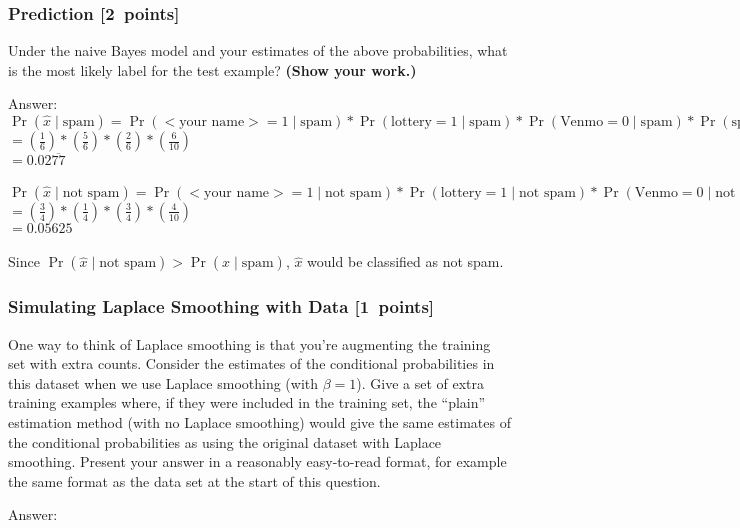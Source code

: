 \documentclass{article}
\newcommand{\blu}[1]{{\textcolor{blu}{#1}}}
\newenvironment{answer}{\par\begingroup\color{gre}Answer: }{\endgroup}
\let\ask\blu
\newcommand\pts[1]{\textcolor{pointscolour}{[#1~points]}}
\begin{document}
    \subsubsection{Prediction \pts{2}}

    \ask{Under the naive Bayes model and your estimates of the above probabilities, what is the most likely label for the test example? \textbf{(Show your work.)}}
    \begin{answer}\\
    $\Pr(\hat{x} \mid \text{spam}) = \Pr(\text{$<$your name$>$} = 1 \mid \text{spam}) * \Pr(\text{lottery} = 1 \mid \text{spam}) * \Pr(\text{Venmo} = 0 \mid \text{spam}) * \Pr(\text{spam})$ \\
    $= (\frac{1}{6}) * (\frac{5}{6}) * (\frac{2}{6}) * (\frac{6}{10})$ \\
    $= 0.02\overline{77}$ \\ \\
    $\Pr(\hat{x} \mid \text{not spam}) = \Pr(\text{$<$your name$>$} = 1 \mid \text{not spam}) * \Pr(\text{lottery} = 1 \mid \text{not spam}) * \Pr(\text{Venmo} = 0 \mid \text{not spam}) * \Pr(\text{not spam})$ \\
    $= (\frac{3}{4}) * (\frac{1}{4}) * (\frac{3}{4}) * (\frac{4}{10})$ \\
    $= 0.05625$ \\ \\
    Since $\Pr(\hat{x} \mid \text{not spam}) > \Pr(\hat{x} \mid \text{spam})$, $\hat{x}$ would be classified as not spam.
    \end{answer}
    \subsubsection{Simulating Laplace Smoothing with Data \pts{1}}
    \label{laplace.conceptual}

    One way to think of Laplace smoothing is that you're augmenting the training set with extra counts. Consider the estimates of the conditional probabilities in this dataset when we use Laplace smoothing (with $\beta = 1$).
    \ask{Give a set of extra training examples where, if they were included in the training set, the ``plain'' estimation method (with no Laplace smoothing) would give the same estimates of the conditional probabilities as using the original dataset with Laplace smoothing.}
    Present your answer in a reasonably easy-to-read format, for example the same format as the data set at the start of this question.
    \begin{answer}

    \end{answer}
\end{document}
